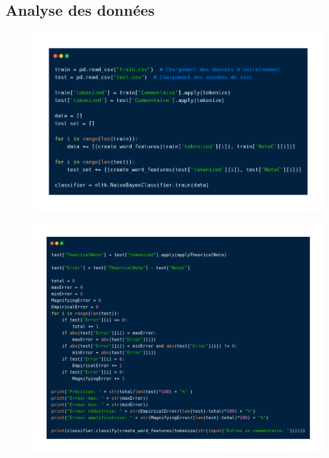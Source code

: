\subsection{Analyse des données}

\begin{frame}{\subsecname}
\begin{figure}[ht]
\includegraphics[scale=.3]{img/scraping_training.png}
\end{figure}
\end{frame}

\begin{frame}{\subsecname}
\begin{figure}[ht]
\includegraphics[scale=.25]{img/scraping_gathering.png}
\end{figure}
\end{frame}
